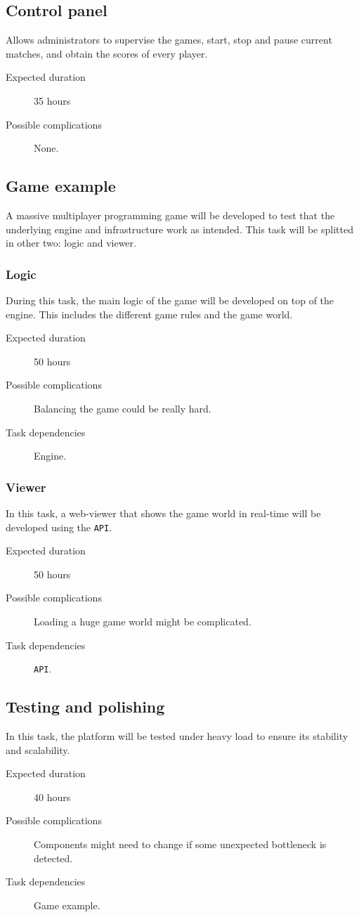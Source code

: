 \documentclass[a4paper,11pt,titlepage,abstract,numbers=noenddot,automark,mnsy,intlimits,rgb,dvipsnames]{report}
\begin{document}
\subsection{Control panel}
Allows administrators to supervise the games, start, stop and pause current matches, and obtain the
scores of every player.
\begin{description}
\item[Expected duration]
35 hours
\item[Possible complications]
None.
\end{description}
\subsection{Game example}
A massive multiplayer programming game will be developed to test that the underlying
engine and infrastructure work as intended. This task will be splitted in other two: logic and viewer.
\subsubsection{Logic}
During this task, the main logic of the game will be developed on top of the engine.
This includes the different game rules and the game world.
\begin{description}
\item[Expected duration]
50 hours
\item[Possible complications]
Balancing the game could be really hard.
\item[Task dependencies]
Engine.
\end{description}
\subsubsection{Viewer}
In this task, a web-viewer that shows the game world in real-time will be developed using the \texttt{API}.
\begin{description}
\item[Expected duration]
50 hours
\item[Possible complications]
Loading a huge game world might be complicated.
\item[Task dependencies]
\texttt{API}.
\end{description}
\subsection{Testing and polishing}
In this task, the platform will be tested under heavy load to ensure its stability and scalability.
\begin{description}
\item[Expected duration]
40 hours
\item[Possible complications]
Components might need to change if some unexpected bottleneck is detected.
\item[Task dependencies]
Game example.
\end{description}
\end{document}
